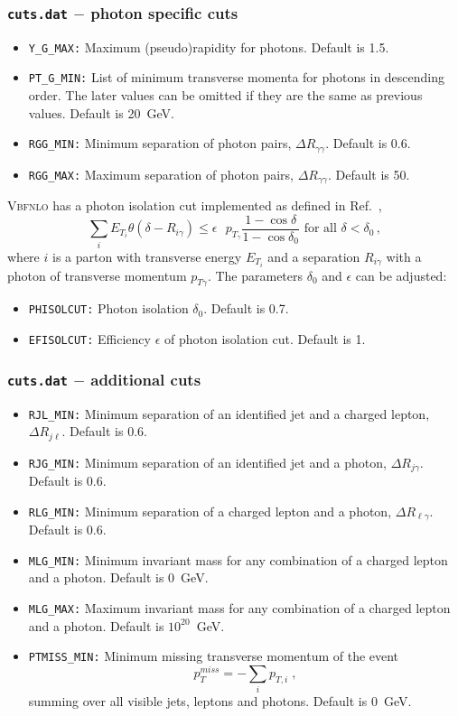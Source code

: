\documentclass[english,12pt]{article}
\newcommand{\VBFNLO}{\textsc{Vbfnlo}}
\begin{document}
\subsubsection{{\tt cuts.dat} $-$ photon specific cuts}
\begin{itemize} 
\item {\tt Y\_G\_MAX:} Maximum (pseudo)rapidity for photons. Default is 1.5.
\item {\tt PT\_G\_MIN:} List of minimum transverse momenta for photons
in descending order. The later values can be omitted if they are the same as
previous values. Default is 20~GeV.
\item {\tt RGG\_MIN:} Minimum separation of photon pairs, $\Delta R_{\gamma\gamma}$. 
Default is 0.6.
\item {\tt RGG\_MAX:} Maximum separation of photon pairs, $\Delta R_{\gamma\gamma}$. 
Default is 50.
\end{itemize}
\VBFNLO{} has a photon isolation cut implemented as defined in Ref.~\cite{Frixione:1998jh},
\begin{equation}
 \sum_{i} E_{T_{i}} \theta(\delta - R_{i\gamma}) \le \epsilon \mbox{ } p_{T_{\gamma}} \frac{1 - \cos \delta}{1 - \cos \delta_{0}} \mbox{   for all } \delta < \delta_{0} \,,
\end{equation}
where $i$ is a parton with transverse energy $E_{T_{i}}$ and a separation $R_{i\gamma}$ with a photon of transverse momentum $p_{T\gamma}$.
The parameters $\delta_{0}$ and $\epsilon$ can be adjusted:
\begin{itemize} 
\item {\tt PHISOLCUT:} Photon isolation $\delta_{0}$.  Default is 0.7.
\item {\tt EFISOLCUT:} Efficiency $\epsilon$ of photon isolation cut. Default is 1.
\end{itemize}

\subsubsection{{\tt cuts.dat} $-$ additional cuts}
\begin{itemize}
\item {\tt RJL\_MIN:} Minimum separation of an identified jet and a charged
lepton, $\Delta R_{j\ell}$. Default is 0.6. 
\item {\tt RJG\_MIN:}  Minimum separation of an identified jet and a photon,
$\Delta R_{j\gamma}$. Default is 0.6. 
\item {\tt RLG\_MIN:}  Minimum separation of a charged lepton and a photon,
$\Delta R_{\ell\gamma}$. Default is 0.6. 
\item {\tt MLG\_MIN:} Minimum invariant mass for any combination of a charged lepton and a photon. Default is 0~GeV.
\item {\tt MLG\_MAX:} Maximum invariant mass for any combination of a charged lepton and a photon. Default is $10^{20}$~GeV.
\item {\tt PTMISS\_MIN:} Minimum missing transverse momentum of the event $${p}_T^{miss}=-\sum_i p_{T,i} \;,$$ summing over
      all visible jets, leptons and photons. Default is 0~GeV.
\end{itemize}
\end{document}
